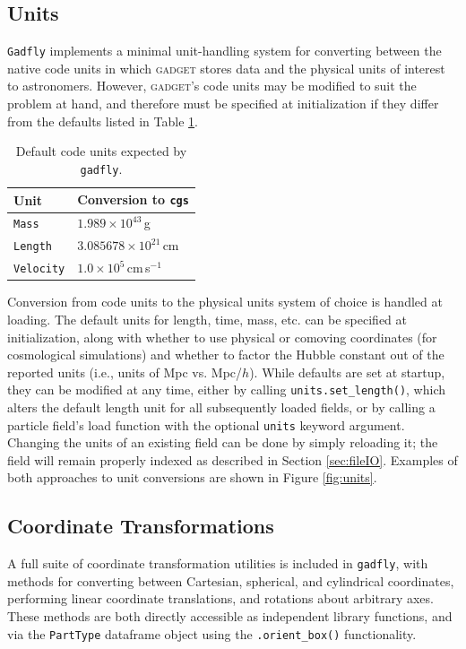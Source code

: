 \documentclass{thesis}
\newcommand{\code}[1]{\texttt{#1}}
\begin{document}
\subsection{Units}
\label{sec:units}
\code{Gadfly} implements a minimal unit-handling system for converting between the native code units in which \textsc{gadget} stores data and the physical units of interest to astronomers.  
However, \textsc{gadget}'s code units may be modified to suit the problem at hand, and therefore must be specified at initialization if they differ from the defaults listed in Table \ref{code_unit_defaults}.
\begin{table}
    \centering
    \caption{Default code units expected by \code{gadfly}.}
    \label{code_unit_defaults}
    \begin{tabular}{ll}
        \hline
        Unit & Conversion to \verb|cgs|\\
        \hline
        \verb|Mass| &  $1.989\times10^{43}\,$g\\ 
        \verb|Length| & $3.085678\times10^{21}\,$cm \\ 
        \verb|Velocity| & $1.0\times10^5\,$cm$\,$s$^{-1}$ \\ 
    \end{tabular} 
\end{table}
Conversion from code units to the physical units system of choice is handled at loading.
The default units for length, time, mass, etc. can be specified at initialization, along with whether to use physical or comoving coordinates (for cosmological simulations) and whether to factor the Hubble constant out of the reported units (i.e., units of Mpc vs. Mpc/$h$).
While defaults are set at startup, they can be modified at any time, either by calling \verb|units.set_length()|, which alters the default length unit for all subsequently loaded fields, or by calling a particle field's load function with the optional \code{units} keyword argument.  
Changing the units of an existing field can be done by simply reloading it; the field will remain properly indexed as described in Section \ref{sec:fileIO}. Examples of both approaches to unit conversions are shown in Figure \ref{fig:units}.

\subsection{Coordinate Transformations}
\label{sec:coords}
A full suite of coordinate transformation utilities is included in \code{gadfly}, with methods for converting between Cartesian, spherical, and cylindrical coordinates, performing linear coordinate translations, and rotations about arbitrary axes.  
These methods are both directly accessible as independent library functions, and via the \code{PartType} dataframe object using the \verb|.orient_box()| functionality.
\end{document}
